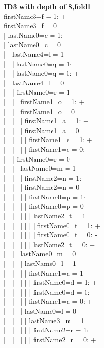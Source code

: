 \begin{enumerate}
		\textbf{ID3 with depth of 8,fold1}\\
firstName3=f = 1: +\\
firstName3=f = 0\\
|  lastName0=c = 1: -\\
|  lastName0=c = 0\\
|  |  lastName4=l = 1\\
|  |  |  lastName0=q = 1: -\\
|  |  |  lastName0=q = 0: +\\
|  |  lastName4=l = 0\\
|  |  |  firstName0=r = 1\\
|  |  |  |  firstName1=o = 1: +\\
|  |  |  |  firstName1=o = 0\\
|  |  |  |  |  firstName1=a = 1: +\\
|  |  |  |  |  firstName1=a = 0\\
|  |  |  |  |  |  firstName1=e = 1: +\\
|  |  |  |  |  |  firstName1=e = 0: -\\
|  |  |  firstName0=r = 0\\
|  |  |  |  lastName0=m = 1\\
|  |  |  |  |  firstName2=n = 1: -\\
|  |  |  |  |  firstName2=n = 0\\
|  |  |  |  |  |  firstName0=p = 1: -\\
|  |  |  |  |  |  firstName0=p = 0\\
|  |  |  |  |  |  |  lastName2=t = 1\\
|  |  |  |  |  |  |  |  firstName0=t = 1: +\\
|  |  |  |  |  |  |  |  firstName0=t = 0: -\\
|  |  |  |  |  |  |  lastName2=t = 0: +\\
|  |  |  |  lastName0=m = 0\\
|  |  |  |  |  lastName0=l = 1\\
|  |  |  |  |  |  firstName1=a = 1\\
|  |  |  |  |  |  |  firstName0=d = 1: +\\
|  |  |  |  |  |  |  firstName0=d = 0: -\\
|  |  |  |  |  |  firstName1=a = 0: +\\
|  |  |  |  |  lastName0=l = 0\\
|  |  |  |  |  |  lastName3=m = 1\\
|  |  |  |  |  |  |  firstName2=r = 1: -\\
|  |  |  |  |  |  |  firstName2=r = 0: +\\

\end{enumerate}
